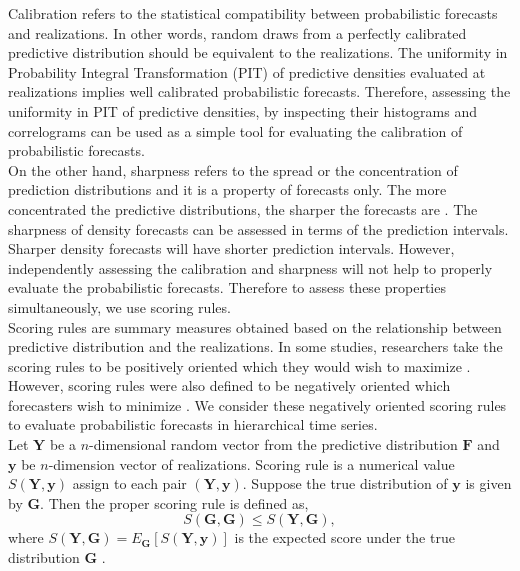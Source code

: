 \documentclass[a4paper, 11pt]{article}
\begin{document}
\noindent
Calibration refers to the statistical compatibility between probabilistic forecasts and realizations. In other words, random draws from a perfectly calibrated predictive distribution should be equivalent to the realizations. The uniformity in Probability Integral Transformation (PIT) of predictive densities evaluated at realizations implies well calibrated probabilistic forecasts. Therefore, assessing the uniformity in PIT of predictive densities, by inspecting their histograms and correlograms can be used as a simple tool for evaluating the calibration of probabilistic forecasts.  \\

\noindent
On the other hand, sharpness refers to the spread or the concentration of prediction distributions and it is a property of forecasts only. The more concentrated the predictive distributions, the sharper the forecasts are \citep{Gneiting2008}. The sharpness of density forecasts can be assessed in terms of the prediction intervals. Sharper density forecasts will have shorter prediction intervals. However, independently assessing the calibration and sharpness will not help to properly evaluate the probabilistic forecasts. Therefore to assess these properties simultaneously, we use scoring rules. \\

\noindent
Scoring rules are summary measures obtained based on the relationship between predictive distribution and the realizations. In some studies, researchers take the scoring rules to be positively oriented which they would wish to maximize \citep{Gneiting2007}. However, scoring rules were also defined to be negatively oriented which forecasters wish to minimize \citep{Gneiting2014}. We consider these negatively oriented scoring rules to evaluate probabilistic forecasts in hierarchical time series. \\

\noindent
Let $\bm{Y}$ be a $n$-dimensional random vector from the predictive distribution $\mathbold{F}$ and $\mathbold{y}$ be $n$-dimension vector of realizations. Scoring rule is a numerical value $S(\mathbold{Y,y})$ assign to each pair $(\mathbold{Y,y})$. Suppose the true distribution of $\mathbold{y}$ is given by $\mathbold{G}$. Then the proper scoring rule is defined as,
\begin{equation}\label{eq:(3.1.)}
S(\mathbold{G,G}) \le S(\mathbold{Y,G}),
\end{equation}
\noindent
where $S(\mathbold{Y,G})=E_{\mathbold{G}}[S(\mathbold{Y,y})]$ is the expected score under the true distribution $\mathbold{G}$ \citep{Gneiting2008, Gneiting2014}. \\
\end{document}
